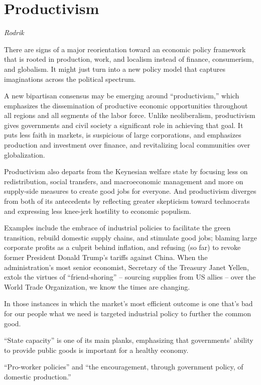 \documentclass[
]{book}
\begin{document}
\hypertarget{productivism}{%
\chapter{Productivism}\label{productivism}}

\emph{Rodrik}

There are signs of a major reorientation toward an economic policy framework that is rooted in production, work, and localism instead of finance, consumerism, and globalism. It might just turn into a new policy model that captures imaginations across the political spectrum.

A new bipartisan consensus may be emerging around ``productivism,'' which emphasizes the dissemination of productive economic opportunities throughout all regions and all segments of the labor force. Unlike neoliberalism, productivism gives governments and civil society a significant role in achieving that goal. It puts less faith in markets, is suspicious of large corporations, and emphasizes production and investment over finance, and revitalizing local communities over globalization.

Productivism also departs from the Keynesian welfare state by focusing less on redistribution, social transfers, and macroeconomic management and more on supply-side measures to create good jobs for everyone. And productivism diverges from both of its antecedents by reflecting greater skepticism toward technocrats and expressing less knee-jerk hostility to economic populism.

Examples include the embrace of industrial policies to facilitate the green transition, rebuild domestic supply chains, and stimulate good jobs; blaming large corporate profits as a culprit behind inflation, and refusing (so far) to revoke former President Donald Trump's tariffs against China. When the administration's most senior economist, Secretary of the Treasury Janet Yellen, extols the virtues of ``friend-shoring'' -- sourcing supplies from US allies -- over the World Trade Organization, we know the times are changing.

In those instances in which the market's most efficient outcome is one that's bad for our people what we need is targeted industrial policy to further the common good.

``State capacity'' is one of its main planks, emphasizing that governments' ability to provide public goods is important for a healthy economy.

``Pro-worker policies'' and ``the encouragement, through government policy, of domestic production.''
\end{document}
